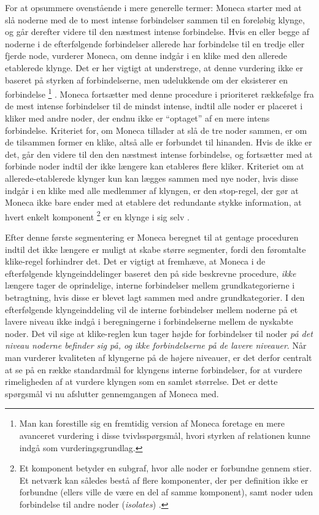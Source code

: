 For at opsummere ovenstående i mere generelle termer: Moneca starter med at slå noderne med de to mest intense forbindelser sammen til en foreløbig klynge, og går derefter videre til den næstmest intense forbindelse. Hvis en eller begge af noderne i de efterfølgende forbindelser allerede har forbindelse til en tredje eller fjerde node, vurderer Moneca, om denne indgår i en klike med den allerede etablerede klynge. Det er her vigtigt at understrege, at denne vurdering ikke er baseret på styrken af forbindelserne, men udelukkende om der eksisterer en forbindelse%
%
\footnote{Man kan forestille sig en fremtidig version af Moneca foretage en mere avanceret vurdering i disse tvivlsspørgsmål, hvori styrken af relationen kunne indgå som vurderingsgrundlag.}
%
. Moneca fortsætter med denne procedure i prioriteret rækkefølge fra de mest intense forbindelser til de mindst intense, indtil alle noder er placeret i kliker med andre noder, der endnu ikke er “optaget” af en mere intens forbindelse. Kriteriet for, om Moneca tillader at slå de tre noder sammen, er om de tilsammen former en klike, altså alle er forbundet til hinanden. Hvis de ikke er det, går den videre til den den næstmest intense forbindelse, og fortsætter med at forbinde noder indtil der ikke længere kan etableres flere kliker. Kriteriet om at allerede-etablerede klynger kun kan lægges sammen med nye noder, hvis disse indgår i en klike med alle medlemmer af klyngen, er den stop-regel, der gør at Moneca ikke bare ender med at etablere det redundante stykke information, at hvert enkelt komponent%
%
\footnote{Et komponent betyder en subgraf, hvor alle noder er forbundne gennem stier. Et netværk kan således bestå af flere komponenter, der per definition ikke er forbundne (ellers ville de være en del af samme komponent), samt noder uden forbindelse til andre noder (\emph{isolates}) \parencite[100]{Scott2000}.}%
er en klynge i sig selv \parencite[8]{Touboel2015}. 

Efter denne  første segmentering er Moneca beregnet til at gentage proceduren indtil det ikke længere er muligt at skabe større segmenter, fordi den føromtalte klike-regel forhindrer det. Det er vigtigt at fremhæve, at Moneca i de efterfølgende klyngeinddelinger baseret den på side \pageref{monecastepbystep} beskrevne procedure, \emph{ikke} længere tager de oprindelige, interne forbindelser mellem grundkategorierne i betragtning, hvis disse er blevet lagt sammen med andre grundkategorier. I den efterfølgende klyngeinddeling vil de interne forbindelser mellem noderne på et lavere niveau ikke indgå i beregningerne i forbindelserne mellem de nyskabte noder. Det vil sige at klike-reglen kun tager højde for forbindelser til noder \emph{på det niveau noderne befinder sig på, og ikke forbindelserne på de lavere niveauer}. Når man vurderer kvaliteten af klyngerne på de højere niveauer, er det derfor centralt at se på en række standardmål for klyngens interne forbindelser, for at vurdere rimeligheden af at vurdere klyngen som en samlet størrelse. Det er dette spørgsmål vi nu afslutter gennemgangen af Moneca med.



